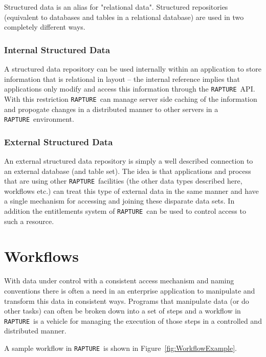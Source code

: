 \documentclass[12pt,twoside,a4paper]{book}
\newcommand{\Rapture}{\Verb+RAPTURE+~}
\begin{document}
Structured data is an alias for "relational data". Structured repositories (equivalent to databases and tables in
a relational database) are used in two completely different ways.

\subsubsection{Internal Structured Data}

A structured data repository can be used internally within an application to store information that is relational in
layout -- the internal reference implies that applications only modify and access this information through the \Rapture API. With
this restriction \Rapture can manage server side caching of the information and propogate changes in a distributed manner to
other servers in a \Rapture environment.

\subsubsection{External Structured Data}

An external structured data repository is simply a well described connection to an external database (and table set). The idea
is that applications and process that are using other \Rapture facilities (the other data types described here, workflows etc.) can
treat this type of external data in the same manner and have a single mechanism for accessing and joining these disparate data sets. In addition
the entitlements system of \Rapture can be used to control access to such a resource.

\section{Workflows}

With data under control with a consistent access mechanism and naming conventions there is often a need in an enterprise application to
manipulate and transform this data in consistent ways. Programs that manipulate data (or do other tasks) can often be broken down into a set of steps
and a workflow in \Rapture is a vehicle for managing the execution of those steps in a controlled and distributed manner.

A sample workflow in \Rapture is shown in Figure~\vref{fig:WorkflowExample}.
\end{document}
